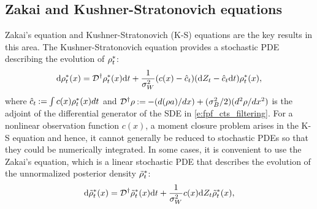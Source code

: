 \subsection{Zakai and Kushner-Stratonovich equations}
Zakai's equation \cite{zak69} and Kushner-Stratonovich (K-S) \cite{kus67, str60} equations are the key results in this area. 
The Kushner-Stratonovich equation provides a stochastic PDE describing the evolution of $\rho^*_t$:
\begin{equation}
\ud \pr^*_t(x) = \generate^\dagger \pr^*_t(x) \ud t + \frac{1}{\sigma^2_W} (c(x) - \hat{c}_t) (\ud Z_t - \hat{c}_t\ud t) \pr^*_t(x),
\label{e:fpf_kushner_stratonovich}
\end{equation}
where ${\hat c}_t \mathbin{:=} \int c(x) \rho^*_t(x) dt$ and ${\cal D}^\dagger \rho \mathbin{:=} - (d(\rho a) / dx) + (\sigma^2_B/2) (d^2 \rho /d x^2)$ is the adjoint of the differential generator of the SDE in \eqref{e:fpf_cts_filtering}. 
For a nonlinear observation function $c(x)$, a moment closure problem arises in the K-S equation and hence, it cannot generally be reduced to stochastic PDEs so that they could be numerically integrated. In some cases, it is convenient to use the Zakai's equation, which is a linear stochastic PDE that describes the evolution of the unnormalized posterior density $\tilde{\rho}^*_t$: 
\begin{equation}
\ud \tilde{\pr}^*_t(x) = \generate^\dagger \tilde{\pr}^*_t(x) \ud t + \frac{1}{\sigma^2_W}  c(x) \ud Z_t \tilde{\pr}^*_t(x), 
\label{e:fpf_zakai}
\end{equation}

